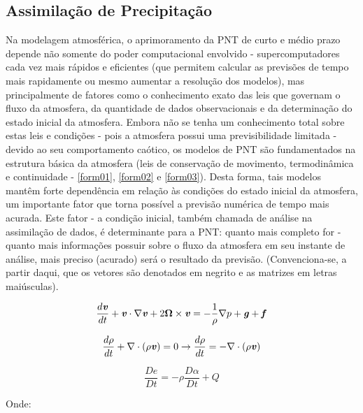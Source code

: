 \subsection{Assimilação de Precipitação}

Na modelagem atmosférica, o aprimoramento da PNT de curto e médio prazo depende não somente do poder computacional envolvido - supercomputadores cada vez mais rápidos e eficientes (que permitem calcular as previsões de tempo mais rapidamente ou mesmo aumentar a resolução dos modelos), mas principalmente de fatores como o conhecimento exato das leis que governam o fluxo da atmosfera, da quantidade de dados observacionais e da determinação do estado inicial da atmosfera.  Embora não se tenha um conhecimento total sobre estas leis e condições - pois a atmosfera possui uma previsibilidade limitada - devido ao seu comportamento caótico, os modelos de PNT são fundamentados na estrutura básica da atmosfera (leis de conservação de movimento, termodinâmica e continuidade - \autoref{form01}, \autoref{form02} e \autoref{form03}). Desta forma, tais modelos mantêm forte dependência em relação às condições do estado inicial da atmosfera, um importante fator que torna possível a previsão numérica de tempo mais acurada. Este fator - a condição inicial, também chamada de análise na assimilação de dados, é determinante para a PNT: quanto mais completo for - quanto mais informações possuir sobre o fluxo da atmosfera em seu instante de análise, mais preciso (acurado) será o resultado da previsão. (Convenciona-se, a partir daqui, que os vetores são denotados em negrito e as matrizes em letras maiúsculas).

\begin{equation}
\frac{d\textbf{\textit{v}}}{dt}+\textbf{\textit{v}}\cdot\nabla\textbf{\textit{v}}+2\mathbf{\Omega}\times\textbf{\textit{v}}=-\frac{1}{\rho}\nabla{p}+\textbf{\textit{g}}+\textbf{\textit{f}}
\label{form01}
\end{equation}

\begin{equation}
\frac{d\rho}{dt}+\nabla\cdot(\rho\textbf{\textit{v}})=0\rightarrow\frac{d\rho}{dt}=-\nabla\cdot(\rho\textbf{\textit{v}})
\label{form02}
\end{equation}

\begin{equation}
\frac{D\textit{e}}{D\textit{t}}=-\rho\frac{D\alpha}{D\textit{t}}+\textit{Q}
\label{form03}
\end{equation}

Onde:

